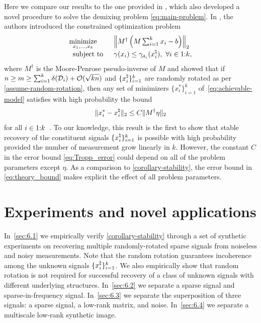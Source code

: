Here we compare our results to the one provided in \cite{mccoy2013achievable}, which also developed a novel procedure to solve the demixing problem \eqref{eq:main-problem}. In \cite{mccoy2013achievable}, the authors introduced the constrained optimization problem
\begin{equation}
    \label{eq:achievable-model}
    \begin{array}{ll}
    \displaystyle\mathop{\hbox{\rm minimize}}_{x_1,\ldots,x_k}\enspace
    & \left\|
      M^\dagger\left(M\sum_{i=1}^k x_i - b\right)
    \right\|_2 \\
   \enspace\mathop{\hbox{\rm subject to}}\enspace
    & \gamma(x_i) \le \gamma_{\!\scriptscriptstyle\mathcal{A}_i}(x_i^{\natural}), \ \forall i\in1\mathord{:}k,
    \end{array}
\end{equation}
where $M^\dagger$ is the Moore-Penrose pseudo-inverse of $M$ and showed that if \(n\ge m\ge \sum_{i=1}^k\delta(\mathcal{D}_i)+\mathcal{O}(\sqrt{kn})\) and $\{x_i^{\natural}\}_{i=1}^k$ are randomly rotated as per \autoref{assume-random-rotation}, then any set of minimizers $\{x_i^*\}_{i=1}^k$ of~\eqref{eq:achievable-model} satisfies with high probability the bound
\begin{equation}\label{eq:Tropp_error}
    \|x_i^*-x_i^{\natural}\|_2\le C\|M^\dagger\eta\|_2
\end{equation}
for all $i\in1\mathord{:}k$~\cite[Theorem~A]{mccoy2013achievable}. To our knowledge, this result is the first to show that stable recovery of the constituent signals $\{x_i^{\natural}\}_{i=1}^k$ is possible with high probability provided the number of measurement grow linearly in $k$. However, the constant $C$ in the error bound \eqref{eq:Tropp_error} could depend on all of the problem parameters except $\eta$. As a comparison to \autoref{corollary-stability}, the error bound in \eqref{eq:theory_bound} makes explicit the effect of all problem parameters.

\section{Experiments and novel applications} \label{sec:6}

In~\autoref{sec:6.1} we empirically verify \autoref{corollary-stability} through a set of synthetic experiments on recovering multiple randomly-rotated sparse signals from noiseless and noisy measurements. Note that the random rotation guarantees incoherence among the unknown signals $\{x_i^{\natural}\}_{i=1}^k$. We also empirically show that random rotation is not required for successful recovery of a class of unknown signals with different underlying structures. In~\autoref{sec:6.2} we separate a sparse signal and sparse-in-frequency signal. In~\autoref{sec:6.3} we separate the superposition of three signals: a sparse signal, a low-rank matrix, and noise. In~\autoref{sec:6.4} we separate a multiscale low-rank synthetic image.

